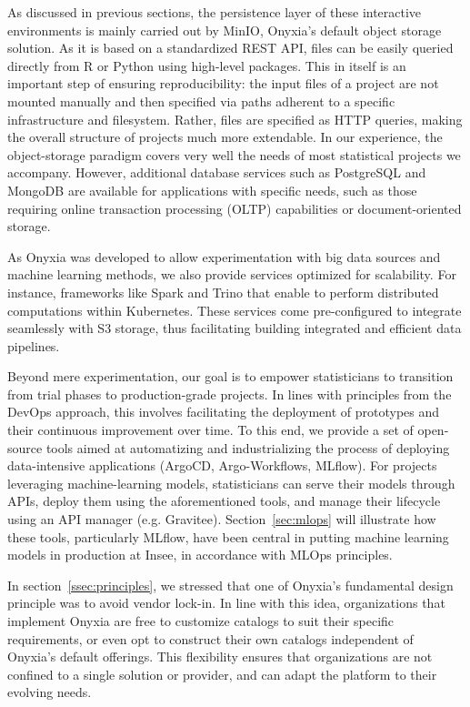 \documentclass[graybox]{svmult}
\begin{document}
As discussed in previous sections, the persistence layer of these interactive environments is mainly carried out by MinIO, Onyxia's default object storage solution. As it is based on a standardized REST API, files can be easily queried directly from R or Python using high-level packages. This in itself is an important step of ensuring reproducibility: the input files of a project are not mounted manually and then specified via paths adherent to a specific infrastructure and filesystem. Rather, files are specified as HTTP queries, making the overall structure of projects much more extendable. In our experience, the object-storage paradigm covers very well the needs of most statistical projects we accompany. However, additional database services such as PostgreSQL and MongoDB are available for applications with specific needs, such as those requiring online transaction processing (OLTP) capabilities or document-oriented storage.

As Onyxia was developed to allow experimentation with big data sources and machine learning methods, we also provide services optimized for scalability. For instance, frameworks like Spark and Trino that enable to perform distributed computations within Kubernetes. These services come pre-configured to integrate seamlessly with S3 storage, thus facilitating building integrated and efficient data pipelines.

Beyond mere experimentation, our goal is to empower statisticians to transition from trial phases to production-grade projects. In lines with principles from the DevOps approach, this involves facilitating the deployment of prototypes and their continuous improvement over time. To this end, we provide a set of open-source tools aimed at automatizing and industrializing the process of deploying data-intensive applications (ArgoCD, Argo-Workflows, MLflow). For projects leveraging machine-learning models, statisticians can serve their models through APIs, deploy them using the aforementioned tools, and manage their lifecycle using an API manager (e.g. Gravitee). Section~\ref{sec:mlops} will illustrate how these tools, particularly MLflow, have been central in putting machine learning models in production at Insee, in accordance with MLOps principles.

In section~\ref{ssec:principles}, we stressed that one of Onyxia's fundamental design principle was to avoid vendor lock-in. In line with this idea, organizations that implement Onyxia are free to customize catalogs to suit their specific requirements, or even opt to construct their own catalogs independent of Onyxia's default offerings. This flexibility ensures that organizations are not confined to a single solution or provider, and can adapt the platform to their evolving needs.
\end{document}
